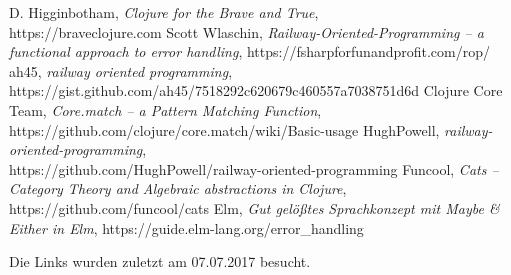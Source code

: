 \documentclass[10pt,journal,compsoc]{IEEEtran}
\begin{document}
  \begin{thebibliography}{1}
    D. Higginbotham, \emph{Clojure for the Brave and True},\\https://braveclojure.com
      Scott Wlaschin, \emph{Railway-Oriented-Programming -- a functional approach to error handling}, https://fsharpforfunandprofit.com/rop/
      ah45, \emph{railway oriented programming},\\https://gist.github.com/ah45/7518292c620679c460557a7038751d6d
      Clojure Core Team, \emph{Core.match -- a Pattern Matching Function}, https://github.com/clojure/core.match/wiki/Basic-usage
    HughPowell, \emph{railway-oriented-programming},\\
    https://github.com/HughPowell/railway-oriented-programming
      Funcool, \emph{Cats -- Category Theory and Algebraic abstractions in Clojure}, https://github.com/funcool/cats
      Elm, \emph{Gut gelößtes Sprachkonzept mit Maybe \& Either in Elm}, https://guide.elm-lang.org/error\_handling
  \end{thebibliography}
  Die Links wurden zuletzt am 07.07.2017 besucht.
\end{document}
